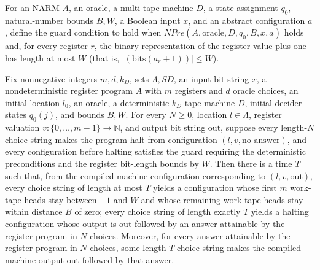 \begin{definition}
\label{Complexity.LogProg.NGuard}
\leanok
{}
For an NARM $A$, an oracle, a multi-tape machine $D$, a state assignment $q_0$,
natural-number bounds $B,W$, a Boolean input $x$, and an abstract configuration $a$,
define the guard condition to hold when $NPre(A,\mathrm{oracle},D,q_0,B,x,a)$ holds and,
for every register $r$, the binary representation of the register value plus one has
length at most $W$ (that is, $|(\mathrm{bits}(a_r+1))|\le W$).
\end{definition}

\begin{theorem}
\label{Complexity.LogProg.narm_run}
\leanok
{}
Fix nonnegative integers $m,d,k_D$, sets $\Lambda,SD$, an input bit string $x$, a
nondeterministic register program $A$ with $m$ registers and $d$ oracle choices, an
initial location $l_0$, an oracle, a deterministic $k_D$-tape machine $D$, initial
decider states $q_0(j)$, and bounds $B,W$. For every $N\ge 0$, location $l\in\Lambda$,
register valuation $v:\{0,\ldots,m-1\}\to\mathbb N$, and output bit string
$\mathrm{out}$, suppose every length-$N$ choice string makes the program halt from
configuration $(l,v,\text{no answer})$, and every configuration before halting satisfies
the guard requiring the deterministic preconditions and the register bit-length bounds
by $W$. Then there is a time $T$ such that, from the compiled machine configuration
corresponding to $(l,v,\mathrm{out})$, every choice string of length at most $T$ yields
a configuration whose first $m$ work-tape heads stay between $-1$ and $W$ and whose
remaining work-tape heads stay within distance $B$ of zero; every choice string of
length exactly $T$ yields a halting configuration whose output is $\mathrm{out}$
followed by an answer attainable by the register program in $N$ choices. Moreover, for
every answer attainable by the register program in $N$ choices, some length-$T$ choice
string makes the compiled machine output $\mathrm{out}$ followed by that answer.
\end{theorem}

